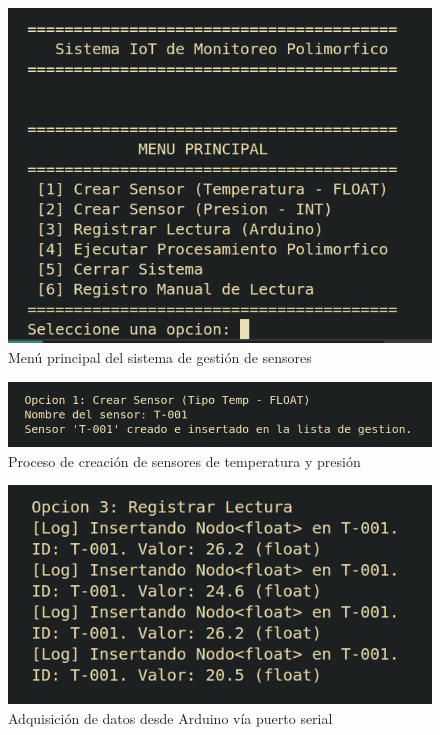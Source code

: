 \documentclass[conference]{IEEEtran}
\begin{document}
\begin{figure}[h]
    \centering
    \includegraphics[width=\RelacionFiguradoscolumnas\columnwidth]{menu_principal.png}
    \caption{Menú principal del sistema de gestión de sensores}
    \label{fig:menu}
\end{figure}

\begin{figure}[h]
    \centering
    \includegraphics[width=\RelacionFiguradoscolumnas\columnwidth]{creacion_sensores.png}
    \caption{Proceso de creación de sensores de temperatura y presión}
    \label{fig:creacion}
\end{figure}

\begin{figure}[h]
    \centering
    \includegraphics[width=\RelacionFiguradoscolumnas\columnwidth]{lectura_arduino.png}
    \caption{Adquisición de datos desde Arduino vía puerto serial}
    \label{fig:arduino}
\end{figure}
\end{document}
